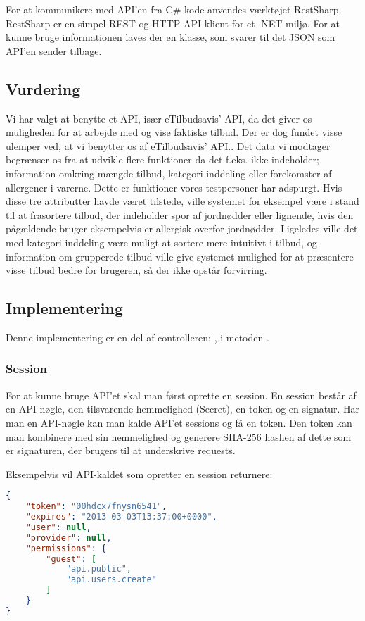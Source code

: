 For at kommunikere med API'en fra C\#-kode anvendes værktøjet RestSharp. RestSharp er en simpel REST og HTTP API klient for et .NET miljø. \citep{RestSharp}
For at kunne bruge informationen laves der en klasse, som svarer til det JSON som API'en sender tilbage.

\subsection{Vurdering}\label{api:skoddata}
Vi har valgt at benytte et API, især eTilbudsavis' API, da det giver os muligheden for at arbejde med og vise faktiske tilbud.
Der er dog fundet visse ulemper ved, at vi benytter os af eTilbudsavis' API.. 
Det data vi modtager begrænser os fra at udvikle flere funktioner da det f.eks. ikke indeholder; information omkring mængde tilbud, kategori-inddeling eller forekomster af allergener i varerne. 
Dette er funktioner vores testpersoner har adspurgt. 
Hvis disse tre attributter havde været tilstede, ville systemet for eksempel være i stand til at frasortere tilbud, der indeholder spor af jordnødder eller lignende, hvis den pågældende bruger eksempelvis er allergisk overfor jordnødder. 
Ligeledes ville det med kategori-inddeling være muligt at sortere mere intuitivt i tilbud, og information om grupperede tilbud ville give systemet mulighed for at præsentere visse tilbud bedre for brugeren, så der ikke opstår forvirring.

\subsection{Implementering}
Denne implementering er en del af controlleren: , i metoden .
\subsubsection{Session}
For at kunne bruge API'et skal man først oprette en session.
En session består af en API-nøgle, den tilsvarende hemmelighed (Secret), en token og en signatur.
Har man en API-nøgle kan man kalde API'et sessions og få en token.
Den token kan man kombinere med sin hemmelighed og generere SHA-256 hashen af dette som er signaturen, der brugers til at underskrive requests.

Eksempelvis vil API-kaldet som opretter en session returnere:
\begin{lstlisting}[language=json,firstnumber=1,caption={POST til sessions API'et med APIKEY'en},label=apilst1]
{
    "token": "00hdcx7fnysn6541",
    "expires": "2013-03-03T13:37:00+0000",
    "user": null,
    "provider": null,
    "permissions": {
        "guest": [
            "api.public",
            "api.users.create"
        ]
    }
}
\end{lstlisting}

